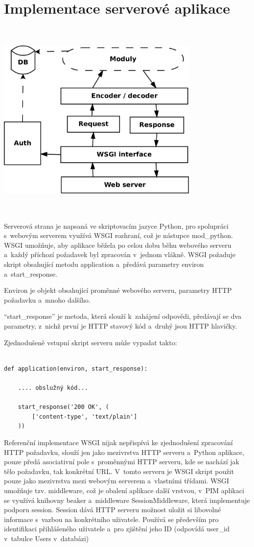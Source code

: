 \documentclass[bc,male,html,dept460]{diploma}				%
\begin{document}
\section{Implementace serverové aplikace}
\label{sec:ServerArchitecture}
\includegraphics[scale=0.6,width=10cm,height=10cm]{../serverArchitecture.png} 
\bigskip

Serverová strana je napsaná ve skriptovacím jazyce Python,
pro spolupráci s~webovým serverem využívá WSGI rozhraní, což je nástupce mod\_python.
WSGI umožňuje, aby aplikace běžela po celou dobu běhu webového serveru a~každý příchozí požadavek byl zpracován v~jednom vlákně.
WSGI požaduje skript obsahující metodu application a~předává parametry environ a~start\_response.

Environ je objekt obsahující proměnné webového serveru, parametry HTTP požadavku a~mnoho dalšího.

``start\_response'' je metoda, která slouží k~zahájení odpovědi, předávají se dva parametry, z~nichž první je HTTP stavový kód a~druhý jsou HTTP hlavičky.

Zjednodušeně vstupní skript serveru může vypadat takto:
\bigskip
\begin{lstlisting}[label=src:Python,caption=Ukázka WSGI aplikace]

def application(environ, start_response):
	
	.... obslužný kód...
	
	start_response('200 OK', (
		['content-type', 'text/plain']
	))
\end{lstlisting}
Referenční implementace WSGI nijak nepřispívá ke zjednodušení zpracování HTTP požadavku, slouží jen jako mezivrstva HTTP serveru a~Python aplikace, pouze předá asociativní pole s~proměnnými HTTP serveru, kde se nachází jak tělo požadavku, tak konkrétní URL.
V~tomto serveru je WSGI skript použit pouze jako mezivrstva mezi webovým serverem a~vlastními třídami.
WSGI umožňuje tzv. middleware, což je obalení aplikace další vrstvou, v~PIM aplikaci se využívá knihovny beaker
a~middleware SessionMiddleware, která implementuje podporu session. Session dává HTTP serveru možnost uložit si
libovolné informace s~vazbou na konkrétního uživatele. Používá se především pro identifikaci přihlášeného uživatele a~pro zjištění jeho ID (odpovídá user\_id v~tabulce Users v~databázi)
\end{document}
